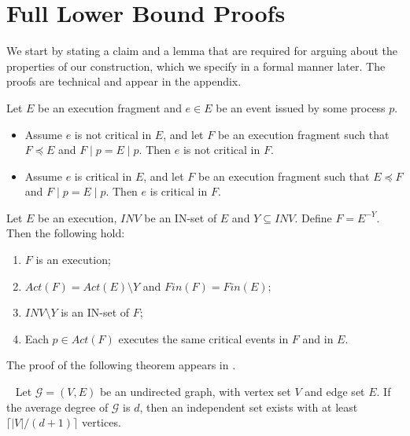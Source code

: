 \section{Full Lower Bound Proofs}
\label{sec:FullProof}

We start by stating a claim and a lemma that are required for arguing about the properties of our construction, which we specify in a formal manner later. The proofs are technical and appear in the appendix.

\begin{claim-num}  \label{claim: maintain-criticalness}
	Let $E$ be an execution fragment and $e \in E$ be an event issued by some process $p$.
	\begin{itemize}[$\bullet$]
		\item Assume $e$ is not critical in $E$, and let $F$ be an execution fragment such that $F \preceq E$ and $F \mid p = E \mid p$. Then $e$ is not critical in $F$.
		\item Assume $e$ is critical in $E$, and let $F$ be an execution fragment such that $E \preceq F$ and $F \mid p = E \mid p$. Then $e$ is critical in $F$.
	\end{itemize}
\end{claim-num}


\begin{lemma} \label{lemma: erase-invis-procs}
	Let $E$ be an execution, $\mathit{INV}$ be an IN-set of $E$ and $Y \subseteq \mathit{INV}$.
	\newline Define $F = E^{-Y}$. Then the following hold:
	\begin{enumerate}
		\item $F$ is an execution;
		\item $Act(F) = Act(E) \setminus Y$ and $Fin(F) = Fin(E)$;
		\item $\mathit{INV} \setminus Y$ is an IN-set of $F$;
		\item Each $p \in Act(F)$ executes the same critical events in $F$ and in $E$.
	\end{enumerate}
\end{lemma}

The proof of the following theorem appears in \cite{Bollobas2004}.

\begin{theorem} [Tur\'{a}n] ~\label{th: turan}
	Let $\mathcal{G} = (V,E)$ be an undirected graph, with vertex set $V$ and edge set $E$. If the average degree of $\mathcal{G}$ is $d$, then an independent set exists with at least $\lceil |V|/(d+1) \rceil$ vertices.
\end{theorem}
	
